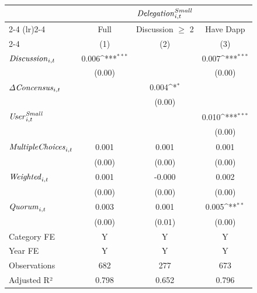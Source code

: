 {
\def\sym#1{\ifmmode^{#1}\else\(^{#1}\)\fi}
\begin{tabular}{l*{3}{c}}
\toprule
                    &\multicolumn{3}{c}{${\it Delegation}^{Small}_{i,t}$}             \\\cmidrule(lr){2-4}
\cmidrule(lr){2-4} & \multicolumn{1}{c}{Full} & \multicolumn{1}{c}{Discussion $\geq$ 2} & \multicolumn{1}{c}{Have Dapp} \\ \cmidrule(lr){2-4} & \multicolumn{1}{c}{(1)} & \multicolumn{1}{c}{(2)} & \multicolumn{1}{c}{(3)} \\ \midrule
${\it Discussion}_{i,t}$&       0.006\sym{***}&                     &       0.007\sym{***}\\
                    &      (0.00)         &                     &      (0.00)         \\
${\it \Delta Concensus}_{i,t}$&                     &       0.004\sym{*}  &                     \\
                    &                     &      (0.00)         &                     \\
${\it User}_{i,t}^{\it Small}$&                     &                     &       0.010\sym{***}\\
                    &                     &                     &      (0.00)         \\
${\it Multiple Choices}_{i,t}$&       0.001         &       0.001         &       0.001         \\
                    &      (0.00)         &      (0.00)         &      (0.00)         \\
${\it Weighted}_{i,t}$&       0.001         &      -0.000         &       0.002         \\
                    &      (0.00)         &      (0.00)         &      (0.00)         \\
${\it Quorum}_{i,t}$&       0.003         &       0.001         &       0.005\sym{**} \\
                    &      (0.00)         &      (0.01)         &      (0.00)         \\
\midrule
Category FE         &           Y         &           Y         &           Y         \\
Year FE             &           Y         &           Y         &           Y         \\
Observations        &         682         &         277         &         673         \\
Adjusted R²         &       0.798         &       0.652         &       0.796         \\
\bottomrule
\end{tabular}
}
